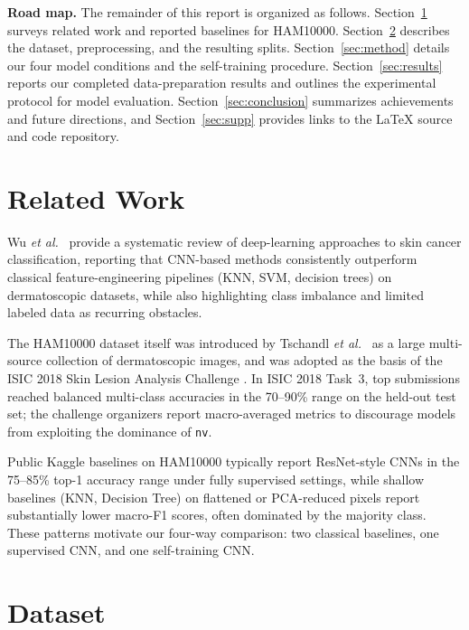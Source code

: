 \documentclass[conference]{IEEEtran}
\begin{document}
\textbf{Road map.} The remainder of this report is organized as follows.
Section~\ref{sec:related} surveys related work and reported baselines
for HAM10000. Section~\ref{sec:dataset} describes the dataset,
preprocessing, and the resulting splits. Section~\ref{sec:method}
details our four model conditions and the self-training procedure.
Section~\ref{sec:results} reports our completed data-preparation
results and outlines the experimental protocol for model evaluation.
Section~\ref{sec:conclusion} summarizes achievements and future
directions, and Section~\ref{sec:supp} provides links to the LaTeX
source and code repository.

\section{Related Work}
\label{sec:related}
Wu \textit{et al.}~\cite{wu2022skin} provide a systematic review of
deep-learning approaches to skin cancer classification, reporting
that CNN-based methods consistently outperform classical
feature-engineering pipelines (KNN, SVM, decision trees) on
dermatoscopic datasets, while also highlighting class imbalance and
limited labeled data as recurring obstacles.

The HAM10000 dataset itself was introduced by Tschandl
\textit{et al.}~\cite{tschandl2018,b3} as a large multi-source
collection of dermatoscopic images, and was adopted as the basis
of the ISIC 2018 Skin Lesion Analysis Challenge
\cite{codella2019}. In ISIC 2018 Task~3, top submissions reached
balanced multi-class accuracies in the 70--90\% range on the held-out
test set; the challenge organizers report macro-averaged metrics to
discourage models from exploiting the dominance of \texttt{nv}.

Public Kaggle baselines on HAM10000 \cite{kaggle2018} typically
report ResNet-style CNNs in the 75--85\% top-1 accuracy range under
fully supervised settings, while shallow baselines (KNN, Decision
Tree) on flattened or PCA-reduced pixels report substantially lower
macro-F1 scores, often dominated by the majority class. These
patterns motivate our four-way comparison: two classical baselines,
one supervised CNN, and one self-training CNN.

\section{Dataset}
\label{sec:dataset}
\end{document}
